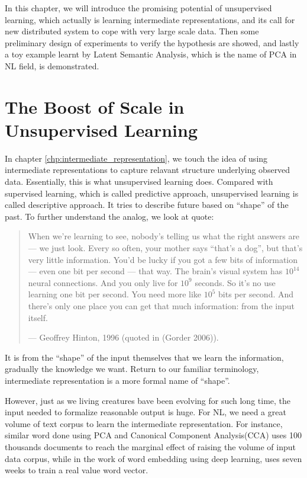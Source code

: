 \documentclass[a4paper]{book}
\begin{document}
In this chapter, we will introduce the promising potential of
unsupervised learning, which actually is learning intermediate
representations, and its call for new distributed system to cope with
very large scale data. Then some preliminary design of experiments to verify
the hypothesis are showed, and lastly a toy example learnt by Latent Semantic
Analysis, which is the name of PCA in NL field, is demonstrated.

  \section{The Boost of Scale in Unsupervised Learning}
  In chapter \ref{chp:intermediate_representation}, we touch the idea
  of using intermediate representations to capture relavant structure
  underlying observed data. Essentially, this is what unsupervised
  learning does. Compared with supervised learning, which is called
  predictive approach, unsupervised learning is called descriptive
  approach. It tries to describe future based on ``shape'' of the past.
  To further understand the analog, we look at quote:

  \begin{quote}
    When we're learning to see, nobody's telling us what the right answers
    are — we just look. Every so often, your mother says “that's a dog”, but
    that's very little information.  You'd be lucky if you got a few bits of
    information — even one bit per second — that way. The brain's visual
    system has $10^{14}$ neural connections. And you only live for $10^9$
    seconds. So it's no use learning one bit per second. You need more like
    $10^5$ bits per second. And there's only one place you can get that much
    information: from the input itself.

    — Geoffrey Hinton, 1996 (quoted in (Gorder 2006)).
  \end{quote}

  It is from the ``shape'' of the input themselves that we learn the
  information, gradually the knowledge we want. Return to our familiar
  terminology, intermediate representation is a more formal name of
  ``shape''.

  However, just as we living creatures bave been evolving for such long
  time, the input needed to formalize reasonable output is huge. For NL,
  we need a great volume of text corpus to learn the intermediate
  representation. For instance, similar word done using PCA and
  Canonical Component Analysis(CCA)\cite{dhillon_icml12_tscca} uses 100
  thousands documents to reach the marginal effect of raising the volume
  of input data corpus, while in the work of word embedding using deep
  learning, \cite{Collobert:2008:UAN:1390156.1390177} uses seven weeks
  to train a real value word vector.
\end{document}
